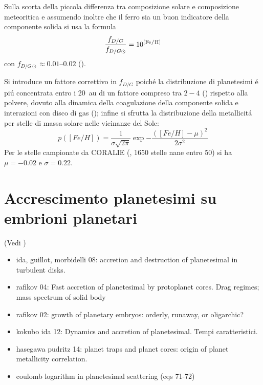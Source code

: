 Sulla scorta della piccola differenza tra composizione solare e composizione meteoritica e assumendo inoltre che il ferro sia un buon indicatore della componente solida  si usa la formula
\begin{equation}
\frac{f_{D/G}}{f_{D/G\odot}}=10\expy{[\cel{Fe}{}{}{}/\cel{H}{}{}{}]}
\end{equation}
con $f_{D/G\odot}\approx\numrange{0.01}{0.02}$ (\cite{lodders2003solar}).

Si introduce un fattore correttivo in $f_{D/G}$ poich\'e la distribuzione di planetesimi \'e pi\'u concentrata entro i \SI{20}{\astronomicalunit} di un fattore compreso tra $2-4$ (\cite{kornet2004alternative}) rispetto alla polvere, dovuto alla dinamica della coagulazione della componente solida e interazioni con disco di gas (\cite{kornet2001diversity}); infine si sfrutta la distribuzione della metallicit\'a per stelle di massa solare nelle vicinanze del Sole:
\begin{equation}
p([Fe/H])=\frac{1}{\sigma\sqrt{2\pi}}\exp{-\frac{([Fe/H]-\mu)^2}{2\sigma^2}}
\end{equation}
Per le stelle campionate da CORALIE (\cite{udry2000coralie}, 1650 stelle nane entro \SI{50}{\parsec}) si ha $\mu=-0.02$ e $\sigma=0.22$.

\begin{workout}

\end{workout}


\section{Accrescimento planetesimi su embrioni planetari}
(Vedi \cite{kokubo2012dynamics})
\begin{workout}
	\begin{itemize}
		\item ida, guillot, morbidelli 08: accretion and destruction of planetesimal in turbulent disks.
		\item rafikov 04: Fast accretion of planetesimal by protoplanet cores. Drag regimes; mass spectrum of solid body
		\item rafikov 02: growth of planetary embryos: orderly, runaway, or oligarchic?
		\item kokubo ida 12: Dynamics and accretion of planetesimal. Tempi caratteristici.
		\item hasegawa pudritz 14: planet traps and planet cores: origin of planet metallicity correlation.
		\item coulomb logarithm in planetesimal scattering \cite{rafikov2003planetesimal} (eqs 71-72)
	\end{itemize}
\end{workout}

